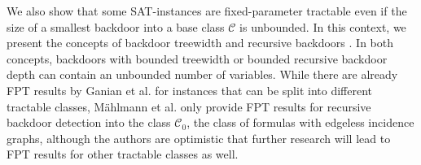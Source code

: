 \documentclass[11pt,a4paper]{article}
\theoremstyle{definition}
\theoremstyle{proposition}
\begin{document}
We also show that some SAT-instances are fixed-parameter tractable even if the size of a smallest backdoor into a base class $\mathcal{C}$ is unbounded. In this context, we present the concepts of backdoor treewidth \cite{GanianBackdoorTreewidth} and recursive backdoors \cite{maehlmann2021recursive}. In both concepts, backdoors with bounded treewidth or bounded recursive backdoor depth can contain an unbounded number of variables. While there are already FPT results by Ganian et al.\cite[p.30]{GanianBackdoorTreewidth} for instances that can be split into different tractable classes, Mählmann et al. only provide FPT results for recursive backdoor detection into the class $\mathcal{C}_0$, the class of formulas with edgeless incidence graphs, although the authors are optimistic that further research will lead to FPT results for other tractable classes as well. 




\end{document}
